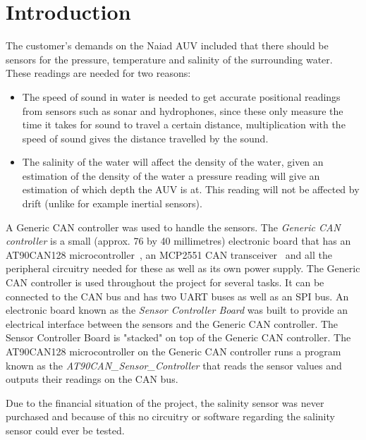 
\section{Introduction}\label{sec:introduction}
The customer's demands on the Naiad AUV included that there should be sensors for the pressure, temperature and salinity of the surrounding water. These readings are needed for two reasons: 

\begin{itemize}
\item The speed of sound in water is needed to get accurate positional readings from sensors such as sonar and hydrophones, since these only measure the time it takes for sound to travel a certain distance, multiplication with the speed of sound gives the distance travelled by the sound.

\item The salinity of the water will affect the density of the water, given an estimation of the density of the water a pressure reading will give an estimation of which depth the AUV is at. This reading will not be affected by drift (unlike for example inertial sensors).

\end{itemize}

A Generic CAN controller was used to handle the sensors. The \emph{Generic CAN controller} is a small (approx. 76 by 40 millimetres) electronic board that has an AT90CAN128 microcontroller~\cite{web:at90can}, an MCP2551 CAN transceiver~\cite{web:mcp2551} and all the peripheral circuitry needed for these as well as its own power supply. The Generic CAN controller is used throughout the project for several tasks. It can be connected to the CAN bus and has two UART buses as well as an SPI bus. \newline
An electronic board known as the \emph{Sensor Controller Board} was built to provide an electrical interface between the sensors and the Generic CAN controller. The Sensor Controller Board is "stacked" on top of the Generic CAN controller. \newline
The AT90CAN128 microcontroller on the Generic CAN controller runs a program known as the \newline
\emph{AT90CAN\_Sensor\_Controller} that reads the sensor values and outputs their readings on the CAN bus.

Due to the financial situation of the project, the salinity sensor was never purchased and because of this no circuitry or software regarding  the salinity sensor could ever be tested. 

